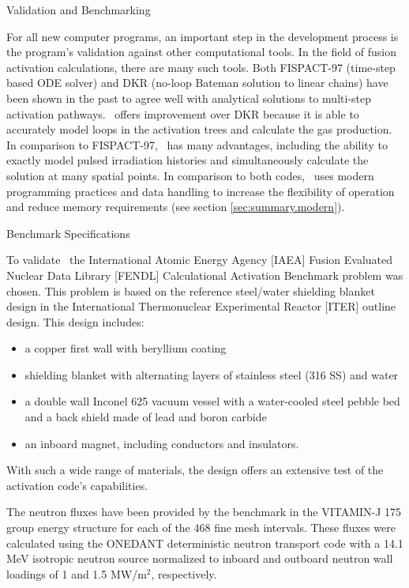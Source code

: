 
\begin{chapter}{Validation and Benchmarking\label{chap:valid}}
  
  For all new computer programs, an important step in the development
  process is the program's validation against other computational
  tools.  In the field of fusion activation calculations, there are
  many such tools.  Both FISPACT-97\cite{FISPACT} (time-step based ODE
  solver) and DKR\cite{DKR} (no-loop Bateman solution to linear
  chains) have been shown in the past to agree well with analytical
  solutions to multi-step activation
  pathways\cite{IAEA.bench2.rep,ITER.exp.valid}.  \ALARA\ offers
  improvement over DKR because it is able to accurately model loops in
  the activation trees and calculate the gas production.  In
  comparison to FISPACT-97, \ALARA\ has many advantages, including the
  ability to exactly model pulsed irradiation histories and
  simultaneously calculate the solution at many spatial points.  In
  comparison to both codes, \ALARA\ uses modern programming practices
  and data handling to increase the flexibility of operation and
  reduce memory requirements (see section \ref{sec:summary.modern}).

  \begin{section}{Benchmark Specifications}
  
    To validate \ALARA\ the International Atomic Energy Agency [IAEA]
    Fusion Evaluated Nuclear Data Library [FENDL] Calculational
    Activation Benchmark\cite{IAEA.bench1.spec} problem was chosen.
    This problem is based on the reference steel/water shielding
    blanket design in the International Thermonuclear Experimental
    Reactor [ITER] outline design.  This design includes:
    \begin{itemize}
    \item a copper first wall with beryllium coating
    \item shielding blanket with alternating layers of stainless steel
      (316 SS) and water
    \item a double wall Inconel 625 vacuum vessel with a water-cooled
      steel pebble bed and a back shield made of lead and boron carbide
    \item an inboard magnet, including conductors and insulators.
    \end{itemize}
    With such a wide range of materials, the design offers an
    extensive test of the activation code's capabilities.
    
    The neutron fluxes have been provided by the benchmark in the
    VITAMIN-J 175 group energy structure for each of the 468 fine mesh
    intervals.  These fluxes were calculated using the
    ONEDANT\cite{ONEDANT} deterministic neutron transport code with a
    14.1 MeV isotropic neutron source normalized to inboard and
    outboard neutron wall loadings of 1 and 1.5 MW/m$^2$,
    respectively.
    

\end{section}
\end{chapter}
